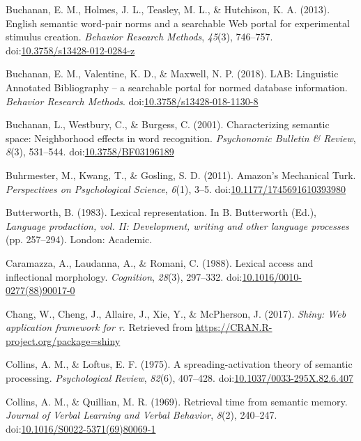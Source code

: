 \documentclass[english,,man]{apa6}
\begin{document}
\leavevmode\hypertarget{ref-Buchanan2013}{}%
Buchanan, E. M., Holmes, J. L., Teasley, M. L., \& Hutchison, K. A. (2013). English semantic word-pair norms and a searchable Web portal for experimental stimulus creation. \emph{Behavior Research Methods}, \emph{45}(3), 746--757. doi:\href{https://doi.org/10.3758/s13428-012-0284-z}{10.3758/s13428-012-0284-z}

\leavevmode\hypertarget{ref-Buchanan2018}{}%
Buchanan, E. M., Valentine, K. D., \& Maxwell, N. P. (2018). LAB: Linguistic Annotated Bibliography -- a searchable portal for normed database information. \emph{Behavior Research Methods}. doi:\href{https://doi.org/10.3758/s13428-018-1130-8}{10.3758/s13428-018-1130-8}

\leavevmode\hypertarget{ref-Buchanan2001}{}%
Buchanan, L., Westbury, C., \& Burgess, C. (2001). Characterizing semantic space: Neighborhood effects in word recognition. \emph{Psychonomic Bulletin \& Review}, \emph{8}(3), 531--544. doi:\href{https://doi.org/10.3758/BF03196189}{10.3758/BF03196189}

\leavevmode\hypertarget{ref-Buhrmester2011}{}%
Buhrmester, M., Kwang, T., \& Gosling, S. D. (2011). Amazon's Mechanical Turk. \emph{Perspectives on Psychological Science}, \emph{6}(1), 3--5. doi:\href{https://doi.org/10.1177/1745691610393980}{10.1177/1745691610393980}

\leavevmode\hypertarget{ref-Butterworth1983}{}%
Butterworth, B. (1983). Lexical representation. In B. Butterworth (Ed.), \emph{Language production, vol. II: Development, writing and other language processes} (pp. 257--294). London: Academic.

\leavevmode\hypertarget{ref-Caramazza1988}{}%
Caramazza, A., Laudanna, A., \& Romani, C. (1988). Lexical access and inflectional morphology. \emph{Cognition}, \emph{28}(3), 297--332. doi:\href{https://doi.org/10.1016/0010-0277(88)90017-0}{10.1016/0010-0277(88)90017-0}

\leavevmode\hypertarget{ref-R-shiny}{}%
Chang, W., Cheng, J., Allaire, J., Xie, Y., \& McPherson, J. (2017). \emph{Shiny: Web application framework for r}. Retrieved from \url{https://CRAN.R-project.org/package=shiny}

\leavevmode\hypertarget{ref-Collins1975}{}%
Collins, A. M., \& Loftus, E. F. (1975). A spreading-activation theory of semantic processing. \emph{Psychological Review}, \emph{82}(6), 407--428. doi:\href{https://doi.org/10.1037/0033-295X.82.6.407}{10.1037/0033-295X.82.6.407}

\leavevmode\hypertarget{ref-Collins1969}{}%
Collins, A. M., \& Quillian, M. R. (1969). Retrieval time from semantic memory. \emph{Journal of Verbal Learning and Verbal Behavior}, \emph{8}(2), 240--247. doi:\href{https://doi.org/10.1016/S0022-5371(69)80069-1}{10.1016/S0022-5371(69)80069-1}
\end{document}
